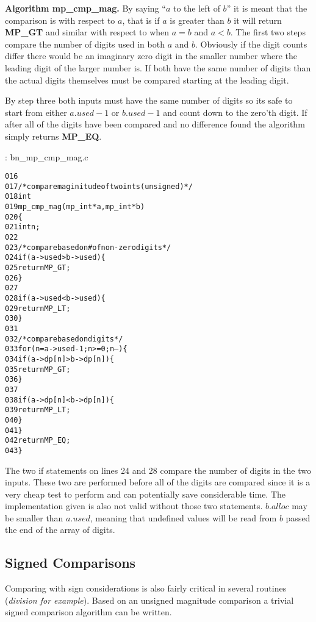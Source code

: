 \documentclass[b5paper]{book}
\begin{document}
\textbf{Algorithm mp\_cmp\_mag.}
By saying ``$a$ to the left of $b$'' it is meant that the comparison is with respect to $a$, that is if $a$ is greater than $b$ it will return
\textbf{MP\_GT} and similar with respect to when $a = b$ and $a < b$.  The first two steps compare the number of digits used in both $a$ and $b$.  
Obviously if the digit counts differ there would be an imaginary zero digit in the smaller number where the leading digit of the larger number is.  
If both have the same number of digits than the actual digits themselves must be compared starting at the leading digit.  

By step three both inputs must have the same number of digits so its safe to start from either $a.used - 1$ or $b.used - 1$ and count down to
the zero'th digit.  If after all of the digits have been compared and no difference found the algorithm simply returns \textbf{MP\_EQ}.

\vspace{+3mm}\begin{small}
\hspace{-5.1mm}{\bf File}: bn\_mp\_cmp\_mag.c
\vspace{-3mm}
\begin{alltt}
016   
017   /* compare maginitude of two ints (unsigned) */
018   int
019   mp_cmp_mag (mp_int * a, mp_int * b)
020   \{
021     int     n;
022   
023     /* compare based on # of non-zero digits */
024     if (a->used > b->used) \{
025       return MP_GT;
026     \} 
027     
028     if (a->used < b->used) \{
029       return MP_LT;
030     \}
031   
032     /* compare based on digits  */
033     for (n = a->used - 1; n >= 0; n--) \{
034       if (a->dp[n] > b->dp[n]) \{
035         return MP_GT;
036       \} 
037       
038       if (a->dp[n] < b->dp[n]) \{
039         return MP_LT;
040       \}
041     \}
042     return MP_EQ;
043   \}
\end{alltt}
\end{small}

The two if statements on lines 24 and 28 compare the number of digits in the two inputs.  These two are performed before all of the digits
are compared since it is a very cheap test to perform and can potentially save considerable time.  The implementation given is also not valid 
without those two statements.  $b.alloc$ may be smaller than $a.used$, meaning that undefined values will be read from $b$ passed the end of the 
array of digits.

\subsection{Signed Comparisons}
Comparing with sign considerations is also fairly critical in several routines (\textit{division for example}).  Based on an unsigned magnitude 
comparison a trivial signed comparison algorithm can be written.
\end{document}
